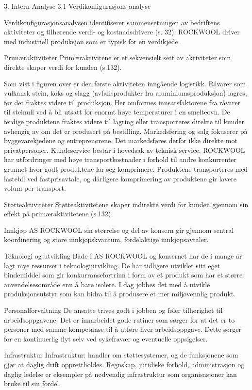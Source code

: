 3. Intern Analyse
3.1 Verdikonfigurasjons-analyse

Verdikonfigurasjonsanalysen identifiserer sammensetningen av bedriftens aktiviteter og tilhørende verdi- og kostnadsdrivere (s. 32). ROCKWOOL driver med industriell produksjon som er typisk for en verdikjede.

Primæraktiviteter
Primæraktivitene er et sekvensielt sett av aktiviteter som direkte skaper verdi for kunden (s.132). 
  
Som vist i figuren over er den første aktiviteten inngående logistikk. Råvarer som vulkansk stein, koks og slagg (avfallsprodukter fra aluminiumsproduksjon) lagres, før det fraktes videre til produksjon. Her omformes innsatsfaktorene fra råvarer til steinull ved å bli utsatt for enormt høye temperaturer i en smelteovn. De ferdige produktene fraktes videre til lagring eller transporteres direkte til kunder avhengig av om det er produsert på bestilling. Markedsføring og salg fokuserer på byggevarekjedene og entreprenørene. Det markedsføres derfor ikke direkte mot privatpersoner. Kundeservice består i hovedsak av teknisk service.
ROCKWOOL har utfordringer med høye transportkostnader i forhold til andre konkurrenter grunnet hvor godt produktene lar seg komprimere. Produktene transporteres med lastebil ved fastprisavtale, og dårligere komprimering av produktene gir lavere volum per transport. 

Støtteaktiviteter
Støtteaktivitetene skaper indirekte verdi for kunden gjennom sin effekt på primæraktivitetene (s.132). 

Innkjøp
AS ROCKWOOL sin størrelse og del av konsern gir gjennom sentral koordinering og store innkjøpskvantum, fordelaktige innkjøpsavtaler.

Teknologi og utvikling
Både i AS ROCKWOOL og konsernet har de i mange år lagt mye ressurser i teknologiutvikling. De har tidligere utviklet sitt eget bindemiddel som gir konkurransefortrinn i form av et produkt som har et større anvendelsesområde enn å bare isolere. I dag jobbes det med å utvikle produksjonsutstyr som kan bidra til å produsere et mer miljøvennlig produkt.

Personalforvaltning
De ansatte trives godt i jobben og føler tilhørighet til arbeidsoppgavene. Det er innarbeidet gode rutiner som sørger for at det er to personer med samme kompetanse til å utføre hver arbeidsoppgave. Dette sørger for en kontinuerlig flyt selv ved sykefravær og eventuelle oppsigelser. 

Infrastruktur
Infrastruktur: handler om støttesystemer, og de funksjonene som gjør at daglig drift opprettholdes. Regnskap, juridiske forhold, administrasjon og daglig ledelse er eksempler på nødvendig infrastruktur som organisasjoner kan bruke til sin fordel.

